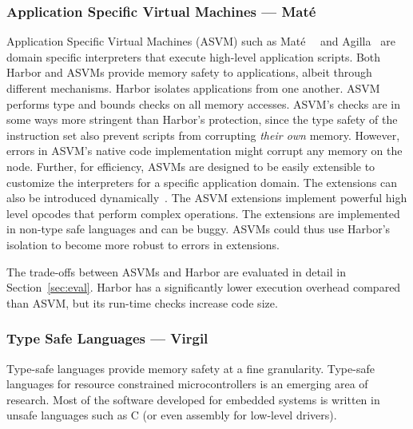 \subsubsection{Application Specific Virtual Machines --- Mat\'e}
%
Application Specific Virtual Machines (ASVM) such as
Mat\'e~\cite{asvm05nsdi}~\cite{levis02mate} and
Agilla~\cite{agilla05ipsn} are domain specific interpreters that
execute high-level application scripts.
%
Both Harbor and ASVMs provide memory safety to applications, albeit
through different mechanisms.
%
Harbor isolates applications from one another.
%
ASVM performs type and bounds checks on all memory accesses.
%
ASVM's checks are in some ways more stringent than Harbor's protection,
since the type safety of the instruction set also prevent scripts from
corrupting \emph{their own} memory.
%
However, errors in ASVM's native code implementation might corrupt any
memory on the node.
%
Further, for efficiency, ASVMs are designed to be easily extensible to
customize the interpreters for a specific application domain.
%
The extensions can also be introduced dynamically~\cite{balani06dvm}.
%
The ASVM extensions implement powerful high level opcodes that perform
complex operations.
%
The extensions are implemented in non-type safe languages and can be
buggy.
%
ASVMs could thus use Harbor's isolation to become more robust to errors in
extensions.


The trade-offs between ASVMs and Harbor are evaluated in detail in
Section~\ref{sec:eval}.
%
Harbor has a significantly lower execution overhead compared than ASVM,
%
but its run-time checks 
increase code size.
%
\subsubsection{Type Safe Languages --- Virgil}
%
Type-safe languages provide memory safety at a fine granularity.
%
Type-safe languages for resource constrained microcontrollers is an
emerging area of research.
%
Most of the software developed for embedded systems is written in
unsafe languages such as C (or even assembly for low-level drivers). 
%
%


